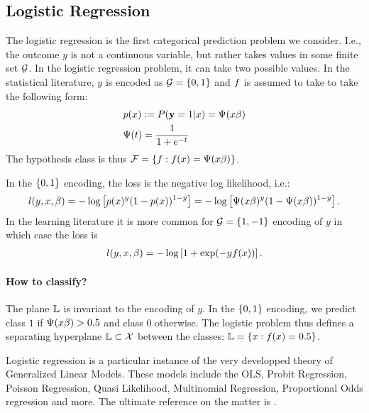 \subsection{Logistic Regression}
\label{sec:logistic}
The logistic regression is the first categorical prediction problem we consider. 
I.e., the outcome $y$ is not a continuous variable, but rather takes values in some finite set $\mathcal{G}$. In the logistic regression problem, it can take two possible values.
In the statistical literature, $y$ is encoded as $\mathcal{G}=\left\{ 0,1 \right\}$ and $f$ is assumed to take to take the following form:
\begin{align}
	& p(x):= P(\mathbf{y}=1|x) = \Psi(x\beta) \\
	& \Psi(t) = \frac{1}{1+e^{-t}}
\end{align}
The hypothesis class is thus  $\mathcal{F}=\left\{ f:f(x)=\Psi(x\beta) \right\} $.

In the $\left\{ 0,1 \right\}$ encoding, the loss is the negative log likelihood, i.e.:
\begin{align}
	l(y,x,\beta) = 
	-\log \left[ p(x)^{y} (1-p(x))^{1-y}  \right] =
	-\log \left[ \Psi(x\beta)^{y} (1-\Psi(x\beta))^{1-y}  \right].
\end{align}
In the learning literature it is more common for $\mathcal{G}=\left\{ 1,-1 \right\}$ encoding of $y$ in which case the loss is 
\begin{align}
	l(y,x,\beta) = -\log \left[ 1+\exp(-y f(x))  \right].
\end{align}


\paragraph{How to classify?}
The plane $\mathbb{L}$ is invariant to the encoding of $y$.
In the $\left\{ 0,1 \right\}$ encoding, we predict class $1$ if $\Psi(x\beta)>0.5$ and class $0$ otherwise.
The logistic problem thus defines a separating hyperplane $\mathbb{L} \subset \mathcal{X}$ between the classes: $\mathbb{L}=\left\{ x:f(x)=0.5 \right\}$.






\begin{remark}
Logistic regression is a particular instance of the very developped theory of Generalized Linear Models.
These models include the OLS, Probit Regression, Poisson Regression, Quasi Likelihood, Multinomial Regression, Proportional Odds regression and more.
The ultimate reference on the matter is \cite{mccullagh_generalized_1989}.
\end{remark}




